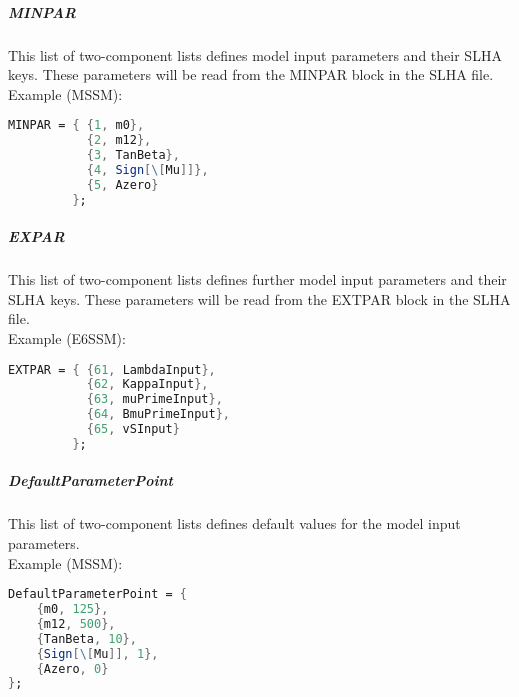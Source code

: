 \subparagraph{MINPAR} This list of two-component lists defines model
input parameters and their SLHA keys.  These parameters will be read
from the MINPAR block in the SLHA file.
\\
Example (MSSM):
\begin{lstlisting}[language=Mathematica]
MINPAR = { {1, m0},
           {2, m12},
           {3, TanBeta},
           {4, Sign[\[Mu]]},
           {5, Azero}
         };
\end{lstlisting}

\subparagraph{EXPAR} This list of two-component lists defines further
model input parameters and their SLHA keys.  These parameters will be
read from the EXTPAR block in the SLHA file.
\\
Example (E6SSM):
\begin{lstlisting}[language=Mathematica]
EXTPAR = { {61, LambdaInput},
           {62, KappaInput},
           {63, muPrimeInput},
           {64, BmuPrimeInput},
           {65, vSInput}
         };
\end{lstlisting}

\subparagraph{DefaultParameterPoint} This list of two-component lists
defines default values for the model input parameters.
\\
Example (MSSM):
\begin{lstlisting}[language=Mathematica]
DefaultParameterPoint = {
    {m0, 125},
    {m12, 500},
    {TanBeta, 10},
    {Sign[\[Mu]], 1},
    {Azero, 0}
};
\end{lstlisting}

